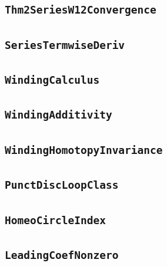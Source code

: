 \documentclass[11pt]{amsart}
\theoremstyle{definition}
\begin{document}
\subsection{\texorpdfstring{\texttt{Thm2SeriesW12Convergence}}{Thm2SeriesW12Convergence}}\label{node:Thm2SeriesW12Convergence}


\subsection{\texorpdfstring{\texttt{SeriesTermwiseDeriv}}{SeriesTermwiseDeriv}}\label{node:SeriesTermwiseDeriv}


\subsection{\texorpdfstring{\texttt{WindingCalculus}}{WindingCalculus}}\label{node:WindingCalculus}


\subsection{\texorpdfstring{\texttt{WindingAdditivity}}{WindingAdditivity}}\label{node:WindingAdditivity}


\subsection{\texorpdfstring{\texttt{WindingHomotopyInvariance}}{WindingHomotopyInvariance}}\label{node:WindingHomotopyInvariance}


\subsection{\texorpdfstring{\texttt{PunctDiscLoopClass}}{PunctDiscLoopClass}}\label{node:PunctDiscLoopClass}


\subsection{\texorpdfstring{\texttt{HomeoCircleIndex}}{HomeoCircleIndex}}\label{node:HomeoCircleIndex}


\subsection{\texorpdfstring{\texttt{LeadingCoefNonzero}}{LeadingCoefNonzero}}\label{node:LeadingCoefNonzero}

\end{document}
